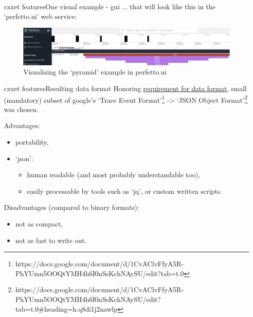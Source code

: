 \documentclass[aspectratio=169]{beamer}
\begin{document}
\begin{frame}[fragile]{cxxet features}{One visual example - gui}
    ... that will look like this in the `perfetto.ui' web service:

    \begin{figure}[h]
        \centering
        \includegraphics[width=\textwidth,height=0.7\textheight,keepaspectratio]{pics/cxxet/pyramid.png}
        \caption{Visualizing the `pyramid' example in perfetto.ui}
    \end{figure}

\end{frame}



\begin{frame}{cxxet features}{Resulting data format}
    Honoring \hyperlink{data_format}{requirement for data format}, small (mandatory) subset of google's `Trace Event Format'\footnote{https://docs.google.com/document/d/1CvAClvFfyA5R-PhYUmn5OOQtYMH4h6I0nSsKchNAySU/edit?tab=t.0} -> `JSON Object Format'\footnote{https://docs.google.com/document/d/1CvAClvFfyA5R-PhYUmn5OOQtYMH4h6I0nSsKchNAySU/edit?tab=t.0\#heading=h.q8di1j2nawlp} was chosen.

    Advantages:

    \begin{itemize}
        \item portability,
        \item `json':
        \begin{itemize}
            \item human readable (and most probably understandable too),
            \item easily processable by tools such as `jq', or custom written scripts.
        \end{itemize}
    \end{itemize}

    Disadvantages (compared to binary formats):

    \begin{itemize}
        \item not as compact,
        \item not as fast to write out.
    \end{itemize}

\end{frame}
\end{document}
